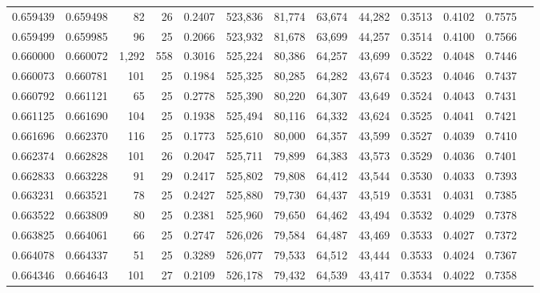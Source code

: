 \begin{tabular}{rrrrrrrrrrrrr}
0.659439 & 0.659498 &    82 &  26 &                                     0.2407 & 523,836 &  81,774 &  63,674 &  44,282 & 0.3513 & 0.4102 & 0.7575 \\
0.659499 & 0.659985 &    96 &  25 &                                     0.2066 & 523,932 &  81,678 &  63,699 &  44,257 & 0.3514 & 0.4100 & 0.7566 \\
0.660000 & 0.660072 & 1,292 & 558 &                                     0.3016 & 525,224 &  80,386 &  64,257 &  43,699 & 0.3522 & 0.4048 & 0.7446 \\
0.660073 & 0.660781 &   101 &  25 &                                     0.1984 & 525,325 &  80,285 &  64,282 &  43,674 & 0.3523 & 0.4046 & 0.7437 \\
0.660792 & 0.661121 &    65 &  25 &                                     0.2778 & 525,390 &  80,220 &  64,307 &  43,649 & 0.3524 & 0.4043 & 0.7431 \\
0.661125 & 0.661690 &   104 &  25 &                                     0.1938 & 525,494 &  80,116 &  64,332 &  43,624 & 0.3525 & 0.4041 & 0.7421 \\
0.661696 & 0.662370 &   116 &  25 &                                     0.1773 & 525,610 &  80,000 &  64,357 &  43,599 & 0.3527 & 0.4039 & 0.7410 \\
0.662374 & 0.662828 &   101 &  26 &                                     0.2047 & 525,711 &  79,899 &  64,383 &  43,573 & 0.3529 & 0.4036 & 0.7401 \\
0.662833 & 0.663228 &    91 &  29 &                                     0.2417 & 525,802 &  79,808 &  64,412 &  43,544 & 0.3530 & 0.4033 & 0.7393 \\
0.663231 & 0.663521 &    78 &  25 &                                     0.2427 & 525,880 &  79,730 &  64,437 &  43,519 & 0.3531 & 0.4031 & 0.7385 \\
0.663522 & 0.663809 &    80 &  25 &                                     0.2381 & 525,960 &  79,650 &  64,462 &  43,494 & 0.3532 & 0.4029 & 0.7378 \\
0.663825 & 0.664061 &    66 &  25 &                                     0.2747 & 526,026 &  79,584 &  64,487 &  43,469 & 0.3533 & 0.4027 & 0.7372 \\
0.664078 & 0.664337 &    51 &  25 &                                     0.3289 & 526,077 &  79,533 &  64,512 &  43,444 & 0.3533 & 0.4024 & 0.7367 \\
0.664346 & 0.664643 &   101 &  27 &                                     0.2109 & 526,178 &  79,432 &  64,539 &  43,417 & 0.3534 & 0.4022 & 0.7358 \\

\end{tabular}
